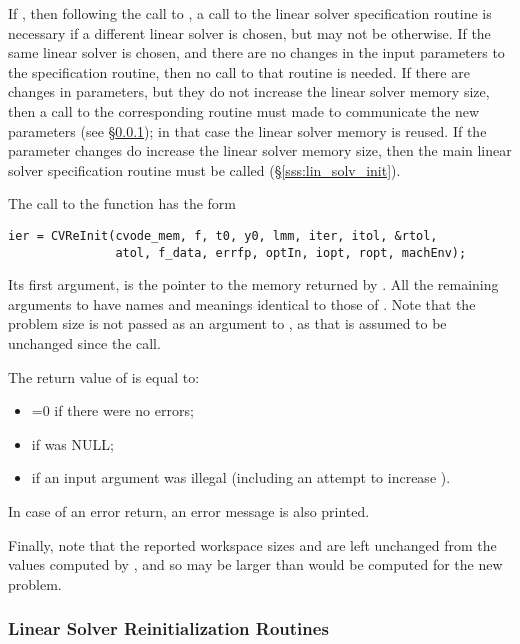 If , then following the call to , a call  
to the linear solver specification routine is necessary if a   
different linear solver is chosen, but may not be otherwise.   
If the same linear solver is chosen, and there are no changes  
in the input parameters to the specification routine, then no  
call to that routine is needed.                                
If there are changes in parameters, but they do not increase   
the linear solver memory size, then a call to the corresponding
 routine must made to communicate the new      
parameters (see \S\ref{sss:lin_solv_reinit}); 
in that case the linear solver memory is reused.   
If the parameter changes do increase the linear solver memory  
size, then the main linear solver specification routine must be
called (\S\ref{sss:lin_solv_init}).

The call to the  function has the form
\begin{verbatim}
ier = CVReInit(cvode_mem, f, t0, y0, lmm, iter, itol, &rtol, 
               atol, f_data, errfp, optIn, iopt, ropt, machEnv);
\end{verbatim}
Its first argument,  is the pointer to the {\cvodes}
memory returned by .
All the remaining arguments to  have names and         
meanings identical to those of .  Note that the     
problem size  is not passed as an argument to ,       
as that is assumed to be unchanged since the  call. 

The return value  of  is equal to: 
\begin{itemize}
\item {}=0 if there were no errors; 
\item {} if  was NULL;
\item {} if an input argument was illegal    
      (including an attempt to increase ).
\end{itemize}
In case of an error return, an error message is also printed.  

Finally, note that the reported workspace sizes \id{[LENRW]} 
and \id{[LENIW]} are left unchanged from the values computed 
by , and so may be larger than would be computed for 
the new problem.

\subsubsection{Linear Solver Reinitialization Routines}\label{sss:lin_solv_reinit}

